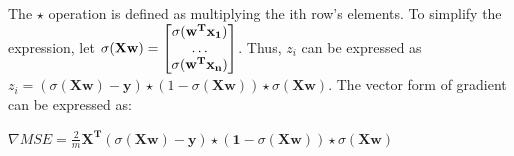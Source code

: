 \documentclass[12pt]{article}
\begin{document}
The $\star$ operation is defined as multiplying the ith row's elements. To simplify the expression, let $\sigma(\mathbf{Xw}) = \left[\begin{array}{@{}c@{}}
                                                                                                         \sigma(\mathbf{w^{T}x_1}) \\
                                                                                                         \dots \\
                                                                                                         \sigma(\mathbf{w^{T}x_n})
                                                                                                         \end{array} \right]$. 
Thus, $z_i$ can be expressed as $z_i = (\sigma(\mathbf{Xw})-\mathbf{y})\star(1 - \sigma(\mathbf{Xw}))\star \sigma(\mathbf{Xw})$. The vector form of gradient can be expressed as: 
\begin{center}
    $\nabla MSE = \frac{2}{m}\mathbf{X^T}(\sigma(\mathbf{Xw})-\mathbf{y})\star (\mathbf{1} - \sigma(\mathbf{Xw}))\star \sigma(\mathbf{Xw})$
\end{center}
\end{document}
